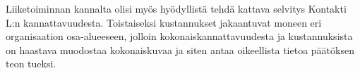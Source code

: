 \documentclass[finnish,12pt,a4paper,pdftex]{article}
\begin{document}
\noindent Liiketoiminnan kannalta olisi myös hyödyllistä tehdä kattava selvitys Kontakti L:n kannattavuudesta. Toistaiseksi kustannukset jakaantuvat moneen eri organisaation osa-alueeseen, jolloin kokonaiskannattavuudesta ja kustannuksista on haastava muodostaa kokonaiskuvaa ja siten antaa oikeellista tietoa päätöksen teon tueksi. \\






\end{document}
